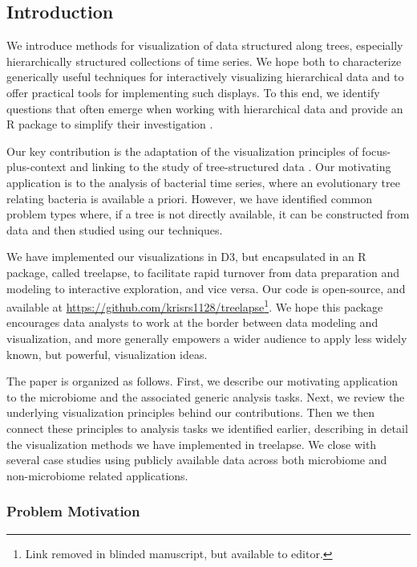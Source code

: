 \documentclass[12pt]{article}
\begin{document}
\newpage
{} %

\subsection*{Introduction}\label{introduction}

We introduce methods for visualization of data structured along trees,
especially hierarchically structured collections of time series. We hope
both to characterize generically useful techniques for interactively
visualizing hierarchical data and to offer practical tools for
implementing such displays. To this end, we identify questions that
often emerge when working with hierarchical data and provide an R
package to simplify their investigation \citep{ihaka1996r}.

Our key contribution is the adaptation of the visualization principles
of focus-plus-context and linking to the study of tree-structured data
\citep{buja1996interactive, becker1987brushing}. Our motivating
application is to the analysis of bacterial time series, where an
evolutionary tree relating bacteria is available a priori. However, we
have identified common problem types where, if a tree is not directly
available, it can be constructed from data and then studied using our
techniques.

We have implemented our visualizations in D3, but encapsulated in an R
package, called treelapse, to facilitate rapid turnover from data
preparation and modeling to interactive exploration, and vice versa. Our
code is open-source, and available at
\url{https://github.com/krisrs1128/treelapse}\footnote{Link removed in blinded manuscript,
but available to editor.}. We hope this package encourages data analysts
to work at the border between data modeling and visualization, and more
generally empowers a wider audience to apply less widely known, but
powerful, visualization ideas.

The paper is organized as follows. First, we describe our motivating
application to the microbiome and the associated generic analysis tasks.
Next, we review the underlying visualization principles behind our
contributions. Then we then connect these principles to analysis tasks
we identified earlier, describing in detail the visualization methods we
have implemented in treelapse. We close with several case studies using
publicly available data across both microbiome and non-microbiome
related applications.

\subsubsection*{Problem Motivation}\label{problem-motivation}
\end{document}
